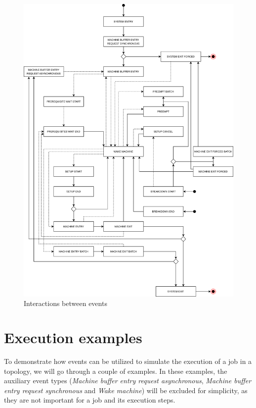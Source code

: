 \begin{figure}[!htbp]
	\centering
	\includegraphics[scale=0.24]{../images/events.png}
	\caption{Interactions between events}
    \label{fig:interactions_between_events}
\end{figure}

\section{Execution examples}
\label{sec:execution_examples}

To demonstrate how events can be utilized to simulate the execution of a job in a topology, we will go through a couple of examples. In these examples, the auxiliary event types (\textit{Machine buffer entry request asynchronous}, \textit{Machine buffer entry request synchronous} and \textit{Wake machine}) will be excluded for simplicity, as they are not important for a job and its execution steps.

